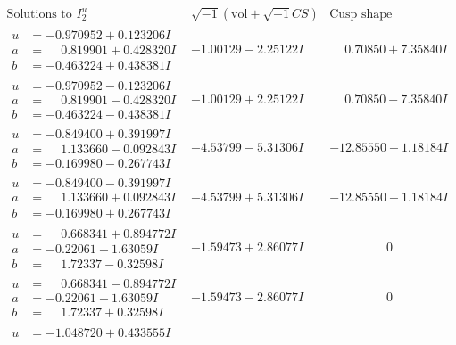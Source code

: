 \documentclass[1p]{elsarticle_modified}
\theoremstyle{definition}
\newcommand{\I}{\sqrt{-1}}
\begin{document}
$$\begin{array}{c|c|c}  
\text{Solutions to }I^u_{2}& \I (\text{vol} + \sqrt{-1}CS) & \text{Cusp shape}\\
 \hline 
\begin{aligned}
u &= -0.970952 + 0.123206 I \\
a &= \phantom{-}0.819901 + 0.428320 I \\
b &= -0.463224 + 0.438381 I\end{aligned}
 & -1.00129 - 2.25122 I & \phantom{-}0.70850 + 7.35840 I \\ \hline\begin{aligned}
u &= -0.970952 - 0.123206 I \\
a &= \phantom{-}0.819901 - 0.428320 I \\
b &= -0.463224 - 0.438381 I\end{aligned}
 & -1.00129 + 2.25122 I & \phantom{-}0.70850 - 7.35840 I \\ \hline\begin{aligned}
u &= -0.849400 + 0.391997 I \\
a &= \phantom{-}1.133660 - 0.092843 I \\
b &= -0.169980 - 0.267743 I\end{aligned}
 & -4.53799 - 5.31306 I & -12.85550 - 1.18184 I \\ \hline\begin{aligned}
u &= -0.849400 - 0.391997 I \\
a &= \phantom{-}1.133660 + 0.092843 I \\
b &= -0.169980 + 0.267743 I\end{aligned}
 & -4.53799 + 5.31306 I & -12.85550 + 1.18184 I \\ \hline\begin{aligned}
u &= \phantom{-}0.668341 + 0.894772 I \\
a &= -0.22061 + 1.63059 I \\
b &= \phantom{-}1.72337 - 0.32598 I\end{aligned}
 & -1.59473 + 2.86077 I & \phantom{-0.000000 } 0 \\ \hline\begin{aligned}
u &= \phantom{-}0.668341 - 0.894772 I \\
a &= -0.22061 - 1.63059 I \\
b &= \phantom{-}1.72337 + 0.32598 I\end{aligned}
 & -1.59473 - 2.86077 I & \phantom{-0.000000 } 0 \\ \hline\begin{aligned}
u &= -1.048720 + 0.433555 I \\

\end{aligned}
\end{array}$$
\end{document}
